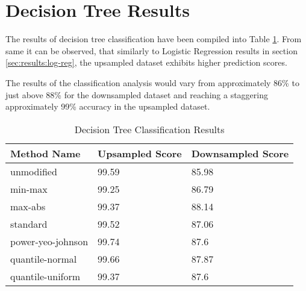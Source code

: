 \section{Decision Tree Results}\label{sec:results:decision-tree}
The results of decision tree classification have been compiled into Table \ref{tbl:results:decision-tree}. From same it can be observed, that similarly to Logistic Regression results in section \ref{sec:results:log-reg}, the upsampled dataset exhibits higher prediction scores. 

The results of the classification analysis would vary from approximately 86\% to just above 88\% for the downsampled dataset and reaching a staggering approximately 99\% accuracy in the upsampled dataset.
\begin{table}[h!]
\centering
\caption{Decision Tree Classification Results}
\label{tbl:results:decision-tree}
\begin{tabular}{@{}lll@{}}
\toprule
Method Name & Upsampled Score & Downsampled Score \\ \midrule
unmodified & 99.59 & 85.98 \\
min-max & 99.25 & 86.79 \\
max-abs & 99.37 & 88.14 \\
standard & 99.52 & 87.06 \\
power-yeo-johnson & 99.74 & 87.6 \\
quantile-normal & 99.66 & 87.87 \\
quantile-uniform & 99.37 & 87.6 \\ \bottomrule
\end{tabular}
\end{table}
